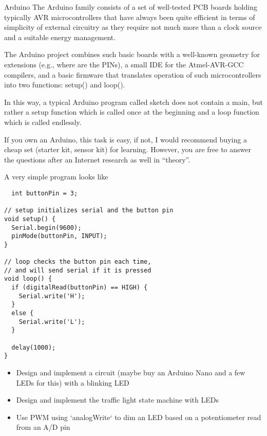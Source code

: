 \begin{task}{Arduino}{}{}
  The Arduino family consists of a set of well-tested PCB boards holding typically AVR microcontrollers that
  have always been quite efficient in terms of simplicity of external circuitry as they require not much more than a clock source and a suitable energy management.

  The Arduino project combines such basic boards with a well-known geometry for extensions (e.g., where are the PINs), a small IDE for the Atmel-AVR-GCC compilers, and a basic firmware that translates operation of such microcontrollers into two functions: setup() and loop().

  In this way, a typical Arduino program called sketch does not contain a main, but rather a setup function which is called once at the beginning and a loop function which is called endlessly.

  If you own an Arduino, this task is easy, if not, I would recommend buying a cheap set (starter kit, sensor kit)
  for learning. However, you are free to answer the questions after an Internet research as well in ``theory''.

  A very simple program looks like
  \begin{lstlisting}
  int buttonPin = 3;

// setup initializes serial and the button pin
void setup() {
  Serial.begin(9600);
  pinMode(buttonPin, INPUT);
}

// loop checks the button pin each time,
// and will send serial if it is pressed
void loop() {
  if (digitalRead(buttonPin) == HIGH) {
    Serial.write('H');
  }
  else {
    Serial.write('L');
  }

  delay(1000);
}
\end{lstlisting}
  
  \begin{itemize}
  \item{Design and implement a circuit (maybe buy an Arduino Nano and a few LEDs for this) with a blinking LED}
  \item{Design and implement the traffic light state machine with LEDs}
  \item{Use PWM using `analogWrite` to dim an LED based on a potentiometer read from an A/D pin}
    
    \end{itemize}

\end{task}
